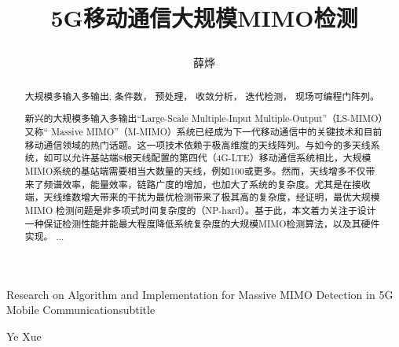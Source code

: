 \documentclass[bachelor,oneside]{seuthesis} %
\begin{document}
\begin{spacing}{1.5}%
\newtheorem{myDef}{定义}
\newtheorem{lemma}{引理}
\newtheorem{theorem}{定理}
\newtheorem{proof}{证明}


\title{\centerline{5G移动通信大规模MIMO检测}}{}{Research on Algorithm and Implementation  for Massive MIMO Detection in 5G Mobile Communication}{subtitle}
\author{薛\quad{}烨}{Ye Xue}
\address{无线谷A1315}
\maketitle

\thispagestyle{seufrontstyle}
\begin{abstract}{大规模多输入多输出, 条件数， 预处理， 收敛分析， 迭代检测， 现场可编程门阵列。}
	
  新兴的大规模多输入多输出“Large-Scale Multiple-Input Multiple-Output”（LS-MIMO）又称“ Massive MIMO”（M-MIMO）系统已经成为下一代移动通信中的关键技术和目前移动通信领域的热门话题。这一项技术依赖于极高维度的天线阵列。与如今的多天线系统，如可以允许基站端8根天线配置的第四代（4G-LTE）移动通信系统相比，大规模MIMO系统的基站端需要相当大数量的天线，例如100或更多。然而，天线增多不仅带来了频谱效率，能量效率，链路广度的增加，也加大了系统的复杂度。尤其是在接收端，天线维数增大带来的干扰为最优检测带来了极其高的复杂度，经证明，最优大规模MIMO 检测问题是非多项式时间复杂度的（NP-hard）。基于此，本文着力关注于设计一种保证检测性能并能最大程度降低系统复杂度的大规模MIMO检测算法，以及其硬件实现。
  ...


\end{abstract}


\end{spacing}
\end{document}
